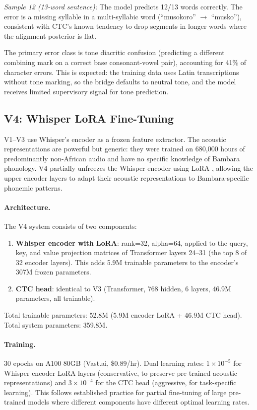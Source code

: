 \documentclass[11pt]{article}
\begin{document}
\textit{Sample 12 (13-word sentence):}
The model predicts 12/13 words correctly.
The error is a missing syllable in a multi-syllabic word (``musokoro'' $\to$ ``musko''), consistent with CTC's known tendency to drop segments in longer words where the alignment posterior is flat.

The primary error class is tone diacritic confusion (predicting a different combining mark on a correct base consonant-vowel pair), accounting for 41\% of character errors.
This is expected: the training data uses Latin transcriptions without tone marking, so the bridge defaults to neutral tone, and the model receives limited supervisory signal for tone prediction.

\subsection{V4: Whisper LoRA Fine-Tuning}
\label{sec:v4}

V1--V3 use Whisper's encoder as a frozen feature extractor.
The acoustic representations are powerful but generic: they were trained on 680,000 hours of predominantly non-African audio and have no specific knowledge of Bambara phonology.
V4 partially unfreezes the Whisper encoder using LoRA \cite{hu2022lora}, allowing the upper encoder layers to adapt their acoustic representations to Bambara-specific phonemic patterns.

\paragraph{Architecture.}
The V4 system consists of two components:
\begin{enumerate}
\item \textbf{Whisper encoder with LoRA}: rank=32, alpha=64, applied to the query, key, and value projection matrices of Transformer layers 24--31 (the top 8 of 32 encoder layers). This adds 5.9M trainable parameters to the encoder's 307M frozen parameters.
\item \textbf{CTC head}: identical to V3 (Transformer, 768 hidden, 6 layers, 46.9M parameters, all trainable).
\end{enumerate}

Total trainable parameters: 52.8M (5.9M encoder LoRA + 46.9M CTC head).
Total system parameters: 359.8M.

\paragraph{Training.}
30 epochs on A100 80GB (Vast.ai, \$0.89/hr).
Dual learning rates: $1 \times 10^{-5}$ for Whisper encoder LoRA layers (conservative, to preserve pre-trained acoustic representations) and $3 \times 10^{-4}$ for the CTC head (aggressive, for task-specific learning).
This follows established practice for partial fine-tuning of large pre-trained models where different components have different optimal learning rates.
\end{document}
